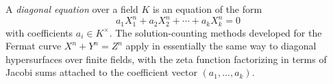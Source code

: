 A \textit{diagonal equation} over a field $K$ is an equation of the form
$$a_1 X_1^n + a_2 X_2^n + \cdots + a_k X_k^n = 0$$
with coefficients $a_i \in K^\times$. The solution-counting methods developed for the Fermat curve $X^n + Y^n = Z^n$ apply in essentially the same way to diagonal hypersurfaces over finite fields, with the zeta function factorizing in terms of Jacobi sums attached to the coefficient vector $(a_1, \dots, a_k)$.
